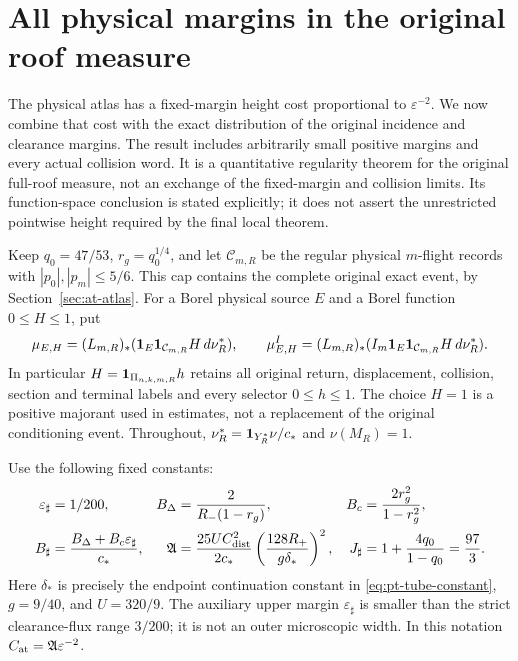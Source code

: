 \section{All physical margins in the original roof measure}
\label{sec:fr-full-roof}
The physical atlas has a fixed-margin height cost proportional to
$\varepsilon^{-2}$.  We now combine that cost with the exact distribution
of the original incidence and clearance margins.  The result includes
arbitrarily small positive margins and every actual collision word.
It is a quantitative regularity theorem for the original full-roof
measure, not an exchange of the fixed-margin and collision limits.
Its function-space conclusion is stated explicitly; it does not assert
the unrestricted pointwise height required by the final local theorem.

Keep $q_0=47/53$, $r_g=q_0^{1/4}$, and let
$\mathcal C_{m,R}$ be the regular physical $m$-flight records with
$|p_0|,|p_m|\le5/6$.  This cap contains the complete original exact
event, by Section~\ref{sec:at-atlas}.  For a Borel physical source $E$
and a Borel function $0\le H\le1$, put
\begin{equation}\label{eq:fr-measures}
 \mu_{E,H}=(L_{m,R})_*
       (\mathbf1_E\mathbf1_{\mathcal C_{m,R}}H\,d\nu_R^*),\qquad
 \mu^I_{E,H}=(L_{m,R})_*
       (I_m\mathbf1_E\mathbf1_{\mathcal C_{m,R}}H\,d\nu_R^*).
\end{equation}
In particular $H=\mathbf1_{\Pi_{n,k,m,R}}h$ retains all original return,
displacement, collision, section and terminal labels and every selector
$0\le h\le1$.  The choice $H=1$ is a positive majorant used in estimates,
not a replacement of the original conditioning event.  Throughout,
$\nu_R^*=\mathbf1_{Y_R^*}\nu/c_*$ and $\nu(M_R)=1$.

Use the following fixed constants:
\begin{align}\label{eq:fr-constants}
 \varepsilon_\sharp&=1/200,&
 B_\Delta&=\frac{2}{R_-(1-r_g)},&
 B_c&=\frac{2r_g^2}{1-r_g^2},\notag\\
 B_\sharp&=\frac{B_\Delta+B_c\varepsilon_\sharp}{c_*},&
 \mathfrak A&=\frac{25U C_{\rm dist}^2}{2c_*}
        \left(\frac{128R_+}{g\delta_*}\right)^2,&
 J_\sharp&=1+\frac{4q_0}{1-q_0}=\frac{97}{3}.
\end{align}
Here $\delta_*$ is precisely the endpoint continuation constant in
\eqref{eq:pt-tube-constant}, $g=9/40$, and $U=320/9$.
The auxiliary upper margin $\varepsilon_\sharp$ is smaller than the
strict clearance-flux range $3/200$; it is not an outer microscopic
width.  In this notation $C_{\rm at}=\mathfrak A\varepsilon^{-2}$.

